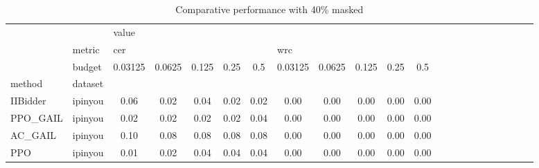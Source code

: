 \begin{table}[htbp]
\centering
\caption{Comparative performance with 40\% masked}
\label{mask_0.40}
\begin{tabular}{l|l|cc|cc|cc|cc|cc|cc|cc|cc|cc|cc}
\toprule
    & {} & \multicolumn{10}{l}{value} \\
    & metric & \multicolumn{5}{l}{cer} & \multicolumn{5}{l}{wrc} \\
    & budget & 0.03125 & 0.0625 & 0.125 & 0.25 &  0.5 & 0.03125 & 0.0625 & 0.125 & 0.25 &  0.5 \\
method & dataset &         &        &       &      &      &         &        &       &      &      \\
\midrule
IIBidder & ipinyou &    0.06 &   0.02 &  0.04 & 0.02 & 0.02 &    0.00 &   0.00 &  0.00 & 0.00 & 0.00 \\
PPO\_GAIL & ipinyou &    0.02 &   0.02 &  0.02 & 0.02 & 0.04 &    0.00 &   0.00 &  0.00 & 0.00 & 0.00 \\
AC\_GAIL & ipinyou &    0.10 &   0.08 &  0.08 & 0.08 & 0.08 &    0.00 &   0.00 &  0.00 & 0.00 & 0.00 \\
PPO & ipinyou &    0.01 &   0.02 &  0.04 & 0.04 & 0.04 &    0.00 &   0.00 &  0.00 & 0.00 & 0.00 \\
\bottomrule
\end{tabular}
\end{table}
